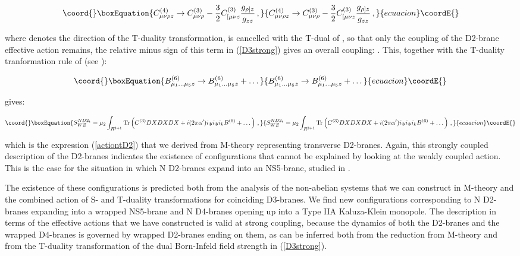 \documentclass[12pt,a4paper]{article}
\begin{document}
\begin{equation}\coord{}\boxEquation{
C^{(4)}_{\mu\nu\rho z}\rightarrow C^{(3)}_{\mu\nu\rho}-\frac32 
C^{(3)}_{[\mu\nu z}\frac{g_{\rho]z}}{g_{zz}}\, ,
}{
C^{(4)}_{\mu\nu\rho z}\rightarrow C^{(3)}_{\mu\nu\rho}-\frac32 
C^{(3)}_{[\mu\nu z}\frac{g_{\rho]z}}{g_{zz}}\, ,
}{ecuacion}\coordE{}\end{equation}

\noindent where \coordHE{} denotes the direction of the T-duality
transformation,
is cancelled with the T-dual of \coordHE{}, 
so that only the \coordHE{} coupling of the D2-brane effective action
remains, the relative
minus sign of this term in (\ref{D3strong}) gives an overall
coupling: 
\coordHE{}. This, together with
the T-duality tranformation rule of \coordHE{} (see \cite{EJL}):

\begin{equation}\coord{}\boxEquation{
B^{(6)}_{\mu_1\dots\mu_5 z}\rightarrow B^{(6)}_{\mu_1\dots\mu_5 z}+
\dots
}{
B^{(6)}_{\mu_1\dots\mu_5 z}\rightarrow B^{(6)}_{\mu_1\dots\mu_5 z}+
\dots
}{ecuacion}\coordE{}\end{equation}

\noindent gives:

\begin{equation}\coord{}\boxEquation{
S^{ND2_t}_{WZ}=\mu_2\int_{R^{2+1}}{\rm Tr}\left(C^{(3)}DXDXDX+
i(2\pi\alpha^\prime)i_\Phi i_\Phi i_k B^{(6)}+\dots\right)\, ,
}{
S^{ND2_t}_{WZ}=\mu_2\int_{R^{2+1}}{\rm Tr}\left(C^{(3)}DXDXDX+
i(2\pi\alpha^\prime)i_\Phi i_\Phi i_k B^{(6)}+\dots\right)\, ,
}{ecuacion}\coordE{}\end{equation}

\noindent which is the expression (\ref{actiontD2}) that we
derived from M-theory representing transverse D2-branes.
Again, this strongly coupled description of the D2-branes indicates
the existence of configurations that cannot be explained
by looking at the weakly coupled action. 
This is the case for the situation in which N D2-branes
expand into an NS5-brane, studied in \cite{Bena}.

The existence of these configurations is
predicted both from the analysis of the non-abelian systems
that we can construct in M-theory and the combined action of
S- and T-duality transformations for coinciding D3-branes.
We find new configurations corresponding to N D2-branes expanding 
into a wrapped NS5-brane \cite{Bena} and N D4-branes opening 
up into a Type IIA Kaluza-Klein monopole. 
The description in terms of the effective actions
that we have constructed is
valid at strong coupling, because the dynamics of both the
D2-branes and the wrapped D4-branes is governed by wrapped D2-branes
ending on them, as can be inferred both from the reduction from
M-theory and from the T-duality transformation
of the dual Born-Infeld field strength in (\ref{D3strong}).
 
\end{document}
